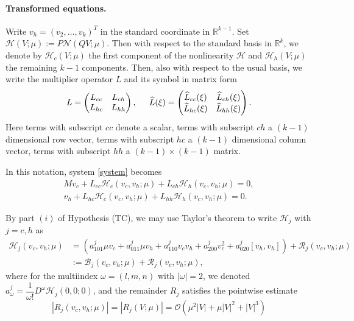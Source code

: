 \documentclass[letterpaper,11pt]{article}
\newcommand{\R}{\mathbb{R}}
\newcommand{\rmO}{\mathcal{O}}
\newcommand{\B}{\mathcal{B}}
\newcommand{\Rm}{\mathcal{R}}
\newcommand{\Nl}{\mathcal{N}}
\numberwithin{equation}{section}
\theoremstyle{plain}
\theoremstyle{remark}
\begin{document}
\paragraph{Transformed equations.} 
Write $v_h = (v_2,\ldots,v_{k})^T$ in the standard coordinate in $\R^{k-1}$. Set $\mathcal{H}(V;\mu) :=P\Nl(QV;\mu)$. Then with respect to the standard basis in $\R^k$, we denote by $\mathcal{H}_c(V;\mu)$ the first component of the nonlinearity $\mathcal{H}$ and $\mathcal{H}_h(V;\mu)$ the remaining $k-1$ components. Then, also with respect to the usual basis, we write the multiplier operator $L$ and its symbol in matrix form
\[
L  = \begin{pmatrix}
L_{cc} & L_{ch} \\
L_{hc} & L_{hh} 
\end{pmatrix}, \hspace{0.2in}
\widehat{L}(\xi)  = \begin{pmatrix}
\widehat{L}_{cc}(\xi) & \widehat{L}_{ch}(\xi) \\
\widehat{L}_{hc}(\xi) & \widehat{L}_{hh}(\xi) 
\end{pmatrix}.
\]
Here terms with subscript $cc$ denote a scalar, terms with subscript $ch$ a $(k-1)$ dimensional row vector, terms with subscript $hc$ a $(k-1)$ dimensional column vector, terms with subscript $hh$ a $(k-1)\times (k-1)$ matrix.

In this notation, system \eqref{system} becomes
\begin{align}
M v_c + L_{cc}\mathcal{H}_c(v_c,v_h;\mu) + L_{ch}\mathcal{H}_h(v_c,v_h;\mu)= 0\label{exeqnu0},\\
v_h +  L_{hc}\mathcal{H}_c(v_c,v_h;\mu) + L_{hh}\mathcal{H}_h(v_c,v_h;\mu) = 0 \label{exeqnuh}.
\end{align}


By part $(i)$ of Hypothesis (TC), we may use Taylor's theorem to write $\mathcal{H}_j$ with $j=c,h$ as
\begin{align*}
\mathcal{H}_j(v_c,v_h;\mu) &=\left( a^j_{101} \mu v_c+a^j_{011}\mu v_h+a^j_{110}v_cv_h + a^j_{200}v_c^2+a^j_{020}[v_h,v_h] \right)+ \Rm_j(v_c,v_h;\mu)\\
&:= \B_j(v_c,v_h;\mu)+\Rm_j(v_c,v_h;\mu),
\end{align*}
where for the multiindex $\omega=(l,m,n)$ with $|\omega|=2$, we denoted $a^j_{\omega} = \dfrac{1}{\omega !}D^{\omega} \mathcal{H}_j(0,0;0)$, and the remainder $R_j$ satisfies the pointwise estimate
\begin{equation}\label{odR}
|R_j(v_c,v_h;\mu)| = |R_j(V;\mu)| = \rmO(\mu^2|V|+\mu|V|^2+|V|^3)
\end{equation} 
\end{document}
